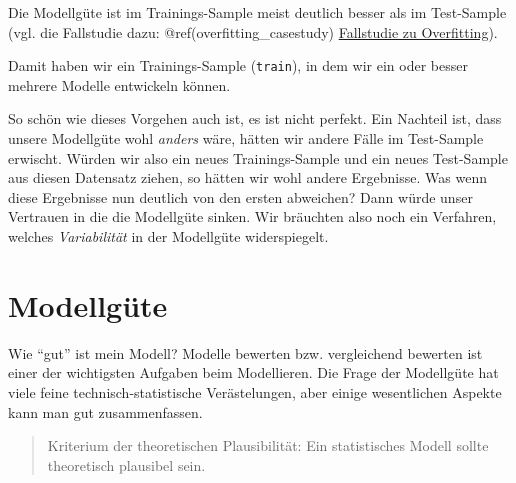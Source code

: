 \documentclass[12pt,]{book}
\makeatletter
\newenvironment{Shaded}{\begin{snugshade}}{\end{snugshade}}
\newcommand{\KeywordTok}[1]{\textcolor[rgb]{0.13,0.29,0.53}{\textbf{{#1}}}}
\newcommand{\DataTypeTok}[1]{\textcolor[rgb]{0.13,0.29,0.53}{{#1}}}
\newcommand{\DecValTok}[1]{\textcolor[rgb]{0.00,0.00,0.81}{{#1}}}
\newcommand{\StringTok}[1]{\textcolor[rgb]{0.31,0.60,0.02}{{#1}}}
\newcommand{\CommentTok}[1]{\textcolor[rgb]{0.56,0.35,0.01}{\textit{{#1}}}}
\newcommand{\OtherTok}[1]{\textcolor[rgb]{0.56,0.35,0.01}{{#1}}}
\newcommand{\NormalTok}[1]{{#1}}
\newenvironment{kframe}{%
\medskip{}
\setlength{\fboxsep}{.8em}
 \def\at@end@of@kframe{}%
 \ifinner\ifhmode%
  \def\at@end@of@kframe{\end{minipage}}%
  \begin{minipage}{\columnwidth}%
 \fi\fi%
 \def\FrameCommand##1{\hskip\@totalleftmargin \hskip-\fboxsep
 \colorbox{shadecolor}{##1}\hskip-\fboxsep
     \hskip-\linewidth \hskip-\@totalleftmargin \hskip\columnwidth}%
 \MakeFramed {\advance\hsize-\width
   \@totalleftmargin\z@ \linewidth\hsize
   \@setminipage}}%
 {\par\unskip\endMakeFramed%
 \at@end@of@kframe}
\renewenvironment{Shaded}{\begin{kframe}}{\end{kframe}}
\makeatother
\begin{document}
Die Modellgüte ist im Trainings-Sample meist deutlich besser als im
Test-Sample (vgl. die Fallstudie dazu: @ref(overfitting\_casestudy)
\protect\hyperlink{overfitting_casestudy}{Fallstudie zu Overfitting}).

\begin{Shaded}
\end{Shaded}

Damit haben wir ein Trainings-Sample (\texttt{train}), in dem wir ein
oder besser mehrere Modelle entwickeln können.

So schön wie dieses Vorgehen auch ist, es ist nicht perfekt. Ein
Nachteil ist, dass unsere Modellgüte wohl \emph{anders} wäre, hätten wir
andere Fälle im Test-Sample erwischt. Würden wir also ein neues
Trainings-Sample und ein neues Test-Sample aus diesen Datensatz ziehen,
so hätten wir wohl andere Ergebnisse. Was wenn diese Ergebnisse nun
deutlich von den ersten abweichen? Dann würde unser Vertrauen in die die
Modellgüte sinken. Wir bräuchten also noch ein Verfahren, welches
\emph{Variabilität} in der Modellgüte widerspiegelt.

\section{Modellgüte}\label{modellgute}

Wie ``gut'' ist mein Modell? Modelle bewerten bzw. vergleichend bewerten
ist einer der wichtigsten Aufgaben beim Modellieren. Die Frage der
Modellgüte hat viele feine technisch-statistische Verästelungen, aber
einige wesentlichen Aspekte kann man gut zusammenfassen.

\begin{quote}
Kriterium der theoretischen Plausibilität: Ein statistisches Modell
sollte theoretisch plausibel sein.
\end{quote}
\end{document}

